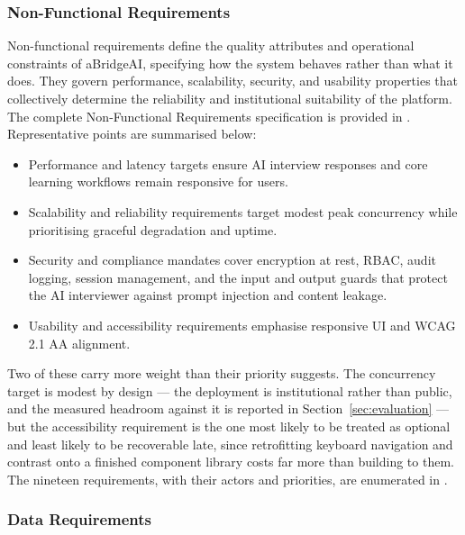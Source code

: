 \subsubsection{Non-Functional Requirements}

Non-functional requirements define the quality attributes and operational constraints of aBridgeAI, specifying how the system behaves rather than what it does. They govern performance, scalability, security, and usability properties that collectively determine the reliability and institutional suitability of the platform. The complete Non-Functional Requirements specification is provided in . Representative points are summarised below:

\begin{itemize}
    \item Performance and latency targets ensure AI interview responses and core learning workflows remain responsive for users.
    \item Scalability and reliability requirements target modest peak concurrency while prioritising graceful degradation and uptime.
    \item Security and compliance mandates cover encryption at rest, RBAC, audit logging, session management, and the input and output guards that protect the AI interviewer against prompt injection and content leakage.
    \item Usability and accessibility requirements emphasise responsive UI and WCAG 2.1 AA alignment.
\end{itemize}

\noindent Two of these carry more weight than their priority suggests. The concurrency target is modest by design --- the deployment is institutional rather than public, and the measured headroom against it is reported in Section~\ref{sec:evaluation} --- but the accessibility requirement is the one most likely to be treated as optional and least likely to be recoverable late, since retrofitting keyboard navigation and contrast onto a finished component library costs far more than building to them. The nineteen requirements, with their actors and priorities, are enumerated in .




\subsubsection{Data Requirements}

